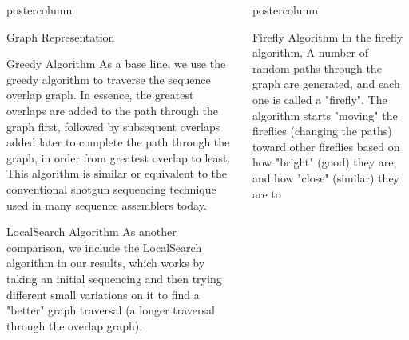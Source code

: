 \documentclass[final,hyperref={pdfpagelabels=false}]{beamer}
\newlength{\columnheight}
\begin{document}
\begin{frame}
\begin{columns}
\begin{column}{.32\textwidth}
\begin{beamercolorbox}[center,wd=\textwidth]{postercolumn}
\begin{minipage}[T]{.95\textwidth}
{\begin{block}{Graph Representation}
\begin{center}
                            \end{center}
                       \end{block}
                        \begin{block}{Greedy Algorithm}
                            As a base line, we use the greedy algorithm to
                            traverse the sequence overlap graph.  In essence,
                            the greatest overlaps are added to the path through
                            the graph first, followed by subsequent overlaps
                            added later to complete the path through the graph,
                            in order from greatest overlap to least.  This
                            algorithm is similar or equivalent to the
                            conventional shotgun sequencing technique used in
                            many sequence assemblers today.
                        \end{block}
                        \begin{block}{LocalSearch Algorithm}
                            As another comparison, we include the LocalSearch
                            algorithm in our results, which works by taking an
                            initial sequencing and then trying different small
                            variations on it to find a "better" graph traversal
                            (a longer traversal through the overlap graph).
                        \end{block}
                } \end{minipage}
            \end{beamercolorbox}
        \end{column}
        \begin{column}{.32\textwidth}
            \begin{beamercolorbox}[center,wd=\textwidth]{postercolumn}
                \begin{minipage}[T]{.95\textwidth}
                    \parbox[t][\columnheight]{\textwidth}{
                        \begin{block}{Firefly Algorithm}
                            In the firefly algorithm, A number of
                            random paths through the graph are generated, and
                            each one is called a "firefly". The algorithm
                            starts "moving" the fireflies (changing the paths)
                            toward other fireflies based on how "bright" (good)
                            they are, and how "close" (similar) they are to

\end{block}}
\end{minipage}
\end{beamercolorbox}
\end{column}
\end{columns}
\end{frame}
\end{document}
